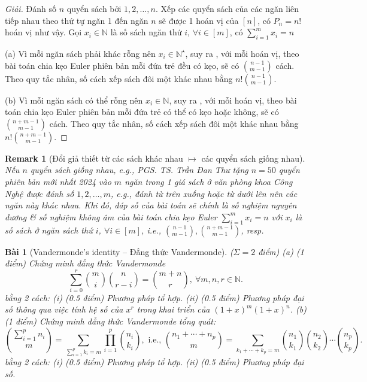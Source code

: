 \documentclass{article}
\newtheorem{baitoan}{Bài}
\newtheorem{remark}{Remark}
\begin{document}
\begin{proof}[Giải]
    Đánh số $n$ quyển sách bởi $1,2,\ldots,n$. Xếp các quyển sách của các ngăn liên tiếp nhau theo thứ tự ngăn 1 đến ngăn $n$ sẽ được 1 hoán vị của $[n]$, có $P_n = n!$ hoán vị như vậy. Gọi $x_i\in\mathbb{N}$ là số sách ngăn thứ $i$, $\forall i\in[m]$, có $\sum_{i=1}^m x_i = n$
    \item(a) Vì mỗi ngăn sách phải khác rỗng nên $x_i\in\mathbb{N}^\star$, suy ra , với mỗi hoán vị, theo bài toán chia kẹo Euler phiên bản mỗi đứa trẻ đều có kẹo, sẽ có $\binom{n - 1}{m - 1}$ cách. Theo quy tắc nhân, số cách xếp sách đôi một khác nhau bằng $n!\binom{n - 1}{m - 1}$.
    \item(b) Vì mỗi ngăn sách có thể rỗng nên $x_i\in\mathbb{N}$, suy ra , với mỗi hoán vị, theo bài toán chia kẹo Euler phiên bản mỗi đứa trẻ có thể có kẹo hoặc không, sẽ có $\binom{n + m - 1}{m - 1}$ cách. Theo quy tắc nhân, số cách xếp sách đôi một khác nhau bằng $n!\binom{n + m - 1}{m - 1}$.
\end{proof}

\begin{remark}[Đổi giả thiết từ các sách khác nhau $\mapsto$ các quyển sách giống nhau]
    Nếu $n$ quyển sách giống nhau, e.g., PGS. TS. {\sc Trần Đan Thư} tặng $n = 50$ quyển \cite{Thu_Phuong_Tien_Triet_NMLT} phiên bản mới nhất 2024 vào $m$ ngăn trong 1 giá sách ở văn phòng khoa Công Nghệ được đánh số $1,2,\ldots,m$, e.g., đánh từ trên xuống hoặc từ dưới lên nên các ngăn này khác nhau. Khi đó, đáp số của bài toán sẽ chính là số nghiệm nguyên dương \& số nghiệm không âm của bài toán chia kẹo Euler $\sum_{i=1}^m x_i = n$ với $x_i$ là số sách ở ngăn sách thứ $i$, $\forall i\in[m]$, i.e., $\binom{n - 1}{m - 1},\binom{n + m - 1}{m - 1}$, resp.
\end{remark}

\begin{baitoan}[Vandermonde's identity -- Đẳng thức Vandermonde]
    {\rm($\Sigma = 2$ điểm)} (a) {\rm(1 điểm)} Chứng minh đẳng thức Vandermonde
    \begin{equation*}
        \sum_{i=0}^r \binom{m}{i}\binom{n}{r - i} = \binom{m + n}{r},\ \forall m,n,r\in\mathbb{N}.
    \end{equation*}
    bằng 2 cách: (i) {\rm(0.5 điểm)} Phương pháp tổ hợp. (ii) {\rm(0.5 điểm)} Phương pháp đại số thông qua việc tính hệ số của $x^r$ trong khai triển của $(1 + x)^m(1 + x)^n$. (b) {\rm(1 điểm)} Chứng minh đẳng thức Vandermonde tổng quát:
    \begin{equation*}
        \binom{\sum_{i=1}^p n_i}{m} = \sum_{\sum_{i=1}^p k_i = m} \prod_{i=1}^p \binom{n_i}{k_i},\mbox{ i.e., }\binom{n_1 + \cdots + n_p}{m} = \sum_{k_1 + \cdots + k_p = m} \binom{n_1}{k_1}\binom{n_2}{k_2}\cdots\binom{n_p}{k_p}.
    \end{equation*}
    bằng 2 cách: (i) {\rm(0.5 điểm)} Phương pháp tổ hợp. (ii) {\rm(0.5 điểm)} Phương pháp đại số.
\end{baitoan}
\end{document}
